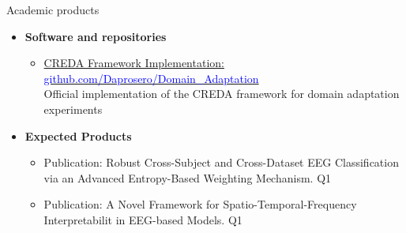 \documentclass[aspectratio=169]{beamer}
\begin{document}
\begin{frame}{Academic products}
\begin{itemize}
\begin{itemize}
        \end{itemize}
        \item \textbf{Software and repositories}
        \begin{itemize}
        \scriptsize
            \item \href{https://github.com/Daprosero/Domain_Adaptation}{CREDA Framework Implementation: \textcolor{blue}{github.com/Daprosero/Domain\_Adaptation}}\\
            Official implementation of the CREDA framework for domain adaptation experiments
        \end{itemize}
    \item \textbf{Expected Products}
        \begin{itemize}
        \scriptsize
            \item Publication: Robust Cross-Subject and Cross-Dataset EEG Classification via an Advanced Entropy-Based Weighting Mechanism. Q1 
            \item Publication: A Novel Framework for Spatio-Temporal-Frequency Interpretabilit in EEG-based  Models. Q1
        \end{itemize}
        
    \end{itemize}
\end{frame}
\end{document}
